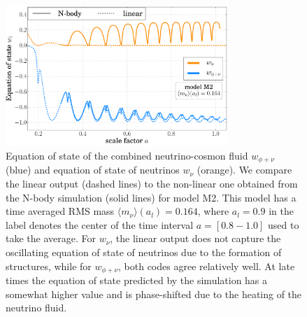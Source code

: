 \begin{figure}
\centering{}\includegraphics[width=0.75\textwidth]{Chapters/gnq/figures/Background-model2-gnq-And-CAMB_wnu-and-wqnu-v1}
\caption[Equation of state of the
combined neutrino-cosmon fluid and of the neutrinos in GNQ.]{\label{fig:backg-wnu-wqnu-mod2} Equation of state of the
combined neutrino-cosmon fluid $w_{\phi+\nu}$ (blue) and equation
of state of neutrinos $w_{\nu}$ (orange). We compare the linear output
(dashed lines) to the non-linear one obtained from the N-body simulation
(solid lines) for model M2. This model has a time averaged RMS mass
$\langle m_{\nu}\rangle(a_{l})=0.164$, where $a_{l}=0.9$ in the
label denotes the center of the time interval $a=[0.8-1.0]$ used
to take the average. For $w_{\nu}$, the linear output does not capture
the oscillating equation of state of neutrinos due to the formation
of structures, while for $w_{\phi+\nu}$, both codes agree relatively
well. At late times the equation of state predicted by the simulation
has a somewhat higher value and is phase-shifted due to the heating
of the neutrino fluid.}
\end{figure}


